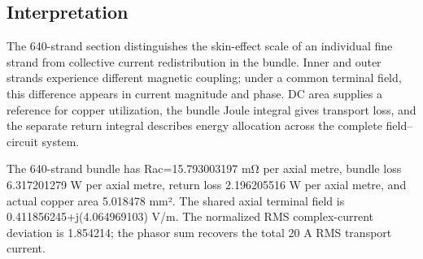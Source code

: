\documentclass[11pt]{article}
\begin{document}
\subsection*{Interpretation}
\hypertarget{04.interpretation.heading}{}
The 640-strand section distinguishes the skin-effect scale of an individual fine strand from collective current redistribution in the bundle. Inner and outer strands experience different magnetic coupling; under a common terminal field, this difference appears in current magnitude and phase. DC area supplies a reference for copper utilization, the bundle Joule integral gives transport loss, and the separate return integral describes energy allocation across the complete field–circuit system.


The 640-strand bundle has Rac=15.793003197 mΩ per axial metre, bundle loss 6.317201279 W per axial metre, return loss 2.196205516 W per axial metre, and actual copper area 5.018478 mm². The shared axial terminal field is 0.411856245+j(4.064969103) V/m. The normalized RMS complex-current deviation is 1.854214; the phasor sum recovers the total 20 A RMS transport current.
\end{document}
